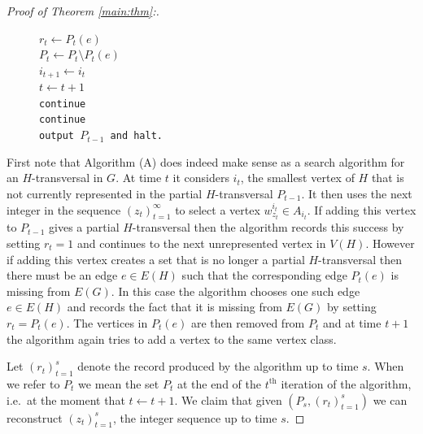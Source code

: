 \documentclass[12]{article}
\def\tr{\textrm}
\begin{document}
\begin{proof}[Proof of Theorem \ref{main:thm}:]
\begin{figure}
\begin{minipage}[c]{\textwidth}
\begin{tabbing}
  \>\>\>  $r_t\leftarrow P_t(e)$\\\>\>\> $P_t\leftarrow P_t\setminus P_t(e)$\\\>\>\> $i_{t+1}\leftarrow i_t$\\
  \>\>  $t\leftarrow t+1$\\
  \>\texttt{continue}\\
  \texttt{continue}\\
  \texttt{output $P_{t-1}$ and halt.}
\end{tabbing}
\end{minipage}
  \end{figure}


First note that Algorithm (A) does indeed make sense as a search algorithm for an $H$-transversal in $G$. At time $t$ it considers $i_t$, the smallest vertex of $H$ that is not currently represented in the partial $H$-transversal $P_{t-1}$. It then uses the next integer in the sequence $(z_{t})_{t=1}^\infty$  to select a vertex  $w_{z_t}^{i_t}\in A_{i_t}$. If adding this vertex to $P_{t-1}$ gives a partial $H$-transversal then the algorithm records this success by setting $r_t=1$ and continues to the next unrepresented vertex in $V(H)$. However if adding this vertex creates a set that is no longer a partial $H$-transversal then there must be an edge  $e\in E(H)$ such that the corresponding edge $P_t(e)$ is missing from $E(G)$. In this case the algorithm chooses one such edge $e\in E(H)$ and records the fact that it is missing from $E(G)$ by setting $r_t=P_t(e)$. The vertices in $P_t(e)$  are then removed from $P_t$ and at time $t+1$ the algorithm again tries to add a vertex to the same vertex class. 
 

Let $(r_t)_{t=1}^s$ denote the record produced by the algorithm up to time $s$. When we refer to $P_t$ we mean the set $P_t$ at the end of the $t^\tr{th}$ iteration of the algorithm, i.e.~at the moment that $t\leftarrow t+1$. We claim that given $(P_s,(r_t)_{t=1}^s)$ we can reconstruct $(z_t)_{t=1}^s$, the integer sequence up to time $s$.
 

\end{proof}
\end{document}
